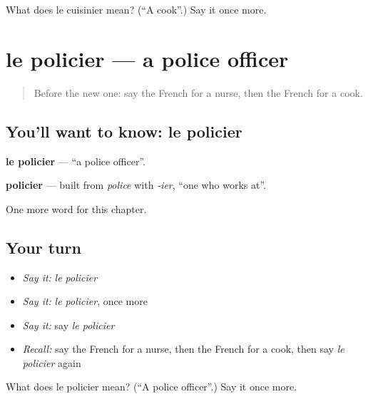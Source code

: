 \begin{tcolorbox}[breakable,colback=teal!4,colframe=teal!35!black,title={Before you move on}]
What does le cuisinier mean? (\textquotedblleft{}A cook\textquotedblright{}.) Say it once more.
\end{tcolorbox}
\section[le policier]{le policier — a police officer}

\label{lesson:FR-C123-policier}



\begin{quote}
Before the new one: say the French for a nurse, then the French for a cook.
\end{quote}

\subsection*{You'll want to know: le policier}
\textbf{le policier} — \textquotedblleft{}a police officer\textquotedblright{}.

\begin{cousinweb}
\textbf{policier} — built from \emph{police} with \emph{-ier}, \textquotedblleft{}one who works at\textquotedblright{}.
\end{cousinweb}

\begin{grammarlens}[title={What you've built}]
One more word for this chapter.
\end{grammarlens}

\subsection*{Your turn}
\begin{itemize}
\raggedright
  \item \emph{Say it:} \emph{le policier}
  \item \emph{Say it:} \emph{le policier}, once more
  \item \emph{Say it:} say \emph{le policier}
  \item \emph{Recall:} say the French for a nurse, then the French for a cook, then say \emph{le policier} again
\end{itemize}

\begin{tcolorbox}[breakable,colback=teal!4,colframe=teal!35!black,title={Before you move on}]
What does le policier mean? (\textquotedblleft{}A police officer\textquotedblright{}.) Say it once more.
\end{tcolorbox}
